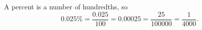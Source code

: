 A percent is a number of hundredths, so
\[0.025\%=\dfrac{0.025}{100}=0.00025=\dfrac{25}{100000}=\boxed{\dfrac{1}{4000}}.\]
